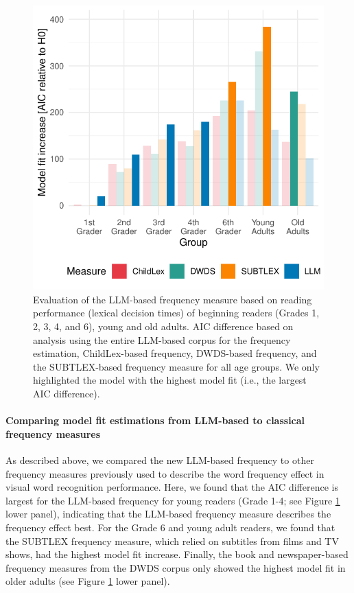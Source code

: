 \documentclass[jou, a4paper]{apa7}
\begin{document}
\begin{figure}[ht]
    \centering
    \includegraphics[scale=.7]{figures/lexica-comp.pdf}
    \caption{Evaluation of the LLM-based frequency measure based on reading performance (lexical decision times) of beginning readers (Grades 1, 2, 3, 4, and 6), young and old adults. AIC difference based on analysis using the entire LLM-based corpus for the frequency estimation, ChildLex-based frequency, DWDS-based frequency, and the SUBTLEX-based frequency measure for all age groups. We only highlighted the model with the highest model fit (i.e., the largest AIC difference).}
\label{fig:modelcomprt}
\end{figure}

\paragraph{Comparing model fit estimations from LLM-based to classical frequency measures}

As described above, we compared the new LLM-based frequency to other frequency measures previously used to describe the word frequency effect in visual word recognition performance. Here, we found that the AIC difference is largest for the LLM-based frequency for young readers (Grade 1-4; see Figure \ref{fig:modelcomprt} lower panel), indicating that the LLM-based frequency measure describes the frequency effect best. For the Grade 6 and young adult readers, we found that the SUBTLEX frequency measure, which relied on subtitles from films and TV shows, had the highest model fit increase. Finally, the book and newspaper-based frequency measures from the DWDS corpus only showed the highest model fit in older adults (see Figure \ref{fig:modelcomprt} lower panel). 
\end{document}
